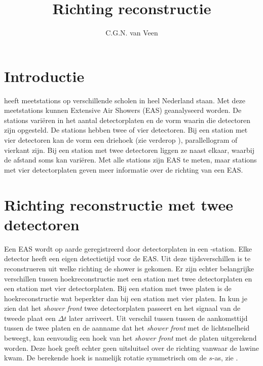 

\title{Richting reconstructie}
\author{C.G.N. van Veen}



\maketitle

\section{Introductie}

\hisparc heeft meetstations op verschillende scholen in heel Nederland
staan. Met deze meetstations kunnen Extensive Air Showers (EAS)
geanalyseerd worden. De stations variëren in het aantal detectorplaten
en de vorm waarin die detectoren zijn opgesteld. De stations hebben twee
of vier detectoren. Bij een station met vier detectoren kan de vorm een
driehoek (zie verderop ), parallellogram of
vierkant zijn. Bij een station met twee detectoren liggen ze naast
elkaar, waarbij de afstand soms kan variëren. Met alle stations zijn EAS
te meten, maar stations met vier detectorplaten geven meer informatie over de richting van een EAS.


\section{Richting reconstructie met twee detectoren}

Een EAS wordt op aarde geregistreerd door detectorplaten in een
\hisparc-station. Elke detector heeft een eigen detectietijd voor de
EAS. Uit deze tijdsverschillen is te reconstrueren uit welke richting de
shower is gekomen. Er zijn echter belangrijke verschillen tussen
hoekreconstructie met een station met twee detectorplaten en een station
met vier detectorplaten. Bij een station met twee platen is de
hoekreconstructie wat beperkter dan bij een station met vier platen. In
 kun je zien dat het \emph{shower front} twee
detectorplaten passeert en het signaal van de tweede plaat een $\Delta t$
later arriveert. Uit verschil tussen tussen de aankomsttijd tussen de
twee platen en de aanname dat het \emph{shower front} met de
lichtsnelheid beweegt, kan eenvoudig een hoek van het \emph{shower front}
met de platen uitgerekend worden. Deze hoek geeft echter
geen uitsluitsel over de richting vanwaar de lawine kwam. De berekende hoek
is namelijk rotatie symmetrisch om de $s$-as, zie
.

